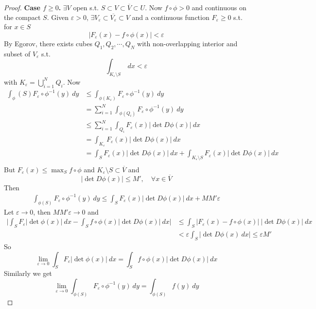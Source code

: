 \documentclass[11pt,openany]{book}
\theoremstyle{plain}
\theoremstyle{definition}
\theoremstyle{remark}
\newcommand{\abs}[1]{\lvert #1 \rvert}
\begin{document}
\begin{proof}
    \textbf{Case $f \ge 0$.} $\exists V$ open s.t. $S \subset V \subset \overline{V} \subset U$. 
    Now $f \circ \phi > 0$ and continuous on the compact $S$. Given $\varepsilon > 0$, $\exists V_\varepsilon \subset \overline{V_\varepsilon} \subset V$
    and a continuous function $F_\varepsilon \ge 0$ s.t. for $x \in S$
    $$\abs{F_\varepsilon(x) - f \circ \phi(x)} < \varepsilon$$
    By Egorov, there exists cubes $Q_1, Q_2, \cdots, Q_N$ with non-overlapping interior and subset of $V_\varepsilon$ 
    s.t. 
    $$\int_{K_\varepsilon \setminus S} \ dx < \varepsilon$$
    with $K_\varepsilon = \bigcup_{i=1}^N Q_i$. Now 
    \begin{align*}
        \int_\phi(S) F_\varepsilon \circ \phi^{-1} (y) \ dy &\le \int_{\phi(K_\varepsilon)} F_\varepsilon \circ \phi^{-1} (y) \ dy \\
        &= \sum_{i=1}^N \int_{\phi(Q_i)} F_\varepsilon \circ \phi^{-1} (y) \ dy \\
        &\le \sum_{i=1}^N \int_{Q_i} F_\varepsilon (x) \abs{\det D\phi(x)} \ dx \\
        &= \int_{K_\varepsilon} F_\varepsilon (x) \abs{\det D\phi(x)} \ dx \\
        &= \int_S F_\varepsilon (x) \abs{\det D\phi(x)} \ dx + \int_{K_\varepsilon \setminus S} F_\varepsilon(x) \abs{\det D\phi(x)} \ dx\\
    \end{align*}
    But $F_\varepsilon (x) \le \max_S f \circ \phi$ and $K_\varepsilon \setminus S \subset \overline{V}$ and 
    $$\abs{\det D\phi(x)} \le M', \quad \forall x \in \overline{V}$$
    Then 
    \begin{align*}
        \int_{\phi(S)} F_\varepsilon \circ \phi^{-1} (y) \ dy \le \int_S F_\varepsilon(x) \abs{\det D\phi(x)} \ dx + MM' \varepsilon
    \end{align*}
    Let $\varepsilon \to 0$, then $M M' \varepsilon \to 0$ and 
    \begin{align*}
        \abs{\int_S F_\varepsilon \abs{\det \phi(x)} \ dx - \int_S f \circ \phi(x) \abs{\det D\phi(x)} \ dx} &\le \int_S \abs{F_\varepsilon(x) - f \circ \phi(x)} \ \abs{\det D\phi(x)} \ dx \\
        &< \varepsilon \int_S \abs{\det D\phi(x) \ dx} \le \varepsilon M'
    \end{align*}
    So 
    $$\lim_{\varepsilon \to 0} \int_S F_\varepsilon \abs{\det \phi(x)} \ dx = \int_S f \circ \phi(x) \abs{\det D\phi(x)} \ dx$$
    Similarly we get 
    $$\lim_{\varepsilon \to 0} \int_{\phi(S)} F_\varepsilon \circ \phi^{-1} (y) \ dy = \int_{\phi(S)} f(y) \ dy$$


\end{proof}
\end{document}
